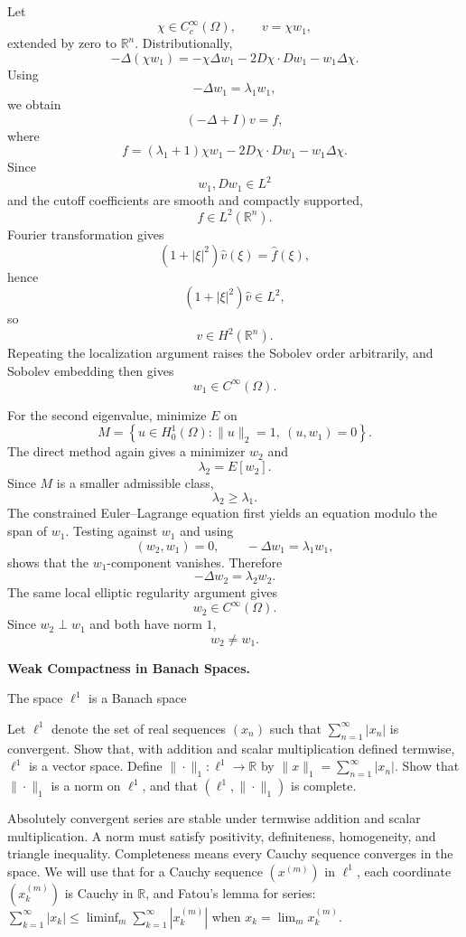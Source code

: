 \begin{solution}
Let
\[
\chi\in C_c^\infty(\Omega),
\qquad
v=\chi w_1,
\]
extended by zero to \(\mathbb R^n\). Distributionally,
\[
-\Delta(\chi w_1)
=
-\chi\Delta w_1
-2D\chi\cdot Dw_1
-w_1\Delta\chi.
\]
Using
\[
-\Delta w_1=\lambda_1w_1,
\]
we obtain
\[
(-\Delta+I)v=f,
\]
where
\[
f
=
(\lambda_1+1)\chi w_1
-2D\chi\cdot Dw_1
-w_1\Delta\chi.
\]
Since
\[
w_1,Dw_1\in L^2
\]
and the cutoff coefficients are smooth and compactly supported,
\[
f\in L^2(\mathbb R^n).
\]
Fourier transformation gives
\[
(1+|\xi|^2)\widehat v(\xi)=\widehat f(\xi),
\]
hence
\[
(1+|\xi|^2)\widehat v\in L^2,
\]
so
\[
v\in H^2(\mathbb R^n).
\]
Repeating the localization argument raises the Sobolev order arbitrarily, and Sobolev embedding then gives
\[
\boxed{w_1\in C^\infty(\Omega).}
\]

For the second eigenvalue, minimize \(E\) on
\[
M=
\left\{
u\in H_0^1(\Omega):
\|u\|_2=1,\ (u,w_1)=0
\right\}.
\]
The direct method again gives a minimizer \(w_2\) and
\[
\lambda_2=E[w_2].
\]
Since \(M\) is a smaller admissible class,
\[
\lambda_2\ge\lambda_1.
\]
The constrained Euler--Lagrange equation first yields an equation modulo the span of \(w_1\). Testing against \(w_1\) and using
\[
(w_2,w_1)=0,
\qquad
-\Delta w_1=\lambda_1w_1,
\]
shows that the \(w_1\)-component vanishes. Therefore
\[
\boxed{
-\Delta w_2=\lambda_2w_2.
}
\]
The same local elliptic regularity argument gives
\[
w_2\in C^\infty(\Omega).
\]
Since \(w_2\perp w_1\) and both have norm \(1\),
\[
w_2\neq w_1.
\]
\end{solution}


\begin{problem}[CP-II-0230]
\label{prob:cp-ii-0230}
\textbf{Weak Compactness in Banach Spaces.}

\hspace*{1.5em}The space $\ell^1$ is a Banach space

Let $\ell^1$ denote the set of real sequences $(x_n)$ such that $\sum_{n=1}^{\infty}|x_n|$ is convergent.
Show that, with addition and scalar multiplication defined termwise, $\ell^1$ is a vector space.
Define $\|\cdot\|_1:\ell^1\to\mathbb{R}$ by $\|x\|_1=\sum_{n=1}^{\infty}|x_n|$.
Show that $\|\cdot\|_1$ is a norm on $\ell^1$, and that $(\ell^1,\|\cdot\|_1)$ is complete.

Absolutely convergent series are stable under termwise addition and scalar multiplication.
A norm must satisfy positivity, definiteness, homogeneity, and triangle inequality.
Completeness means every Cauchy sequence converges in the space.
We will use that for a Cauchy sequence $(x^{(m)})$ in $\ell^1$,
each coordinate $(x^{(m)}_k)$ is Cauchy in $\mathbb{R}$, and Fatou's lemma for series:
$\sum_{k=1}^\infty |x_k| \le \liminf_{m}\sum_{k=1}^\infty |x^{(m)}_k|$ when $x_k=\lim_m x^{(m)}_k$.
\end{problem}

